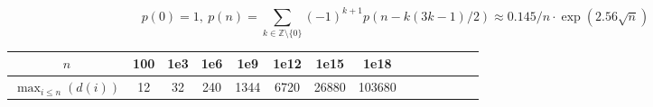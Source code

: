 \vspace{-0.5em}
\[
p(0) = 1,\ p(n) = \sum_{k \in \mathbb Z \setminus \{0\}}{(-1)^{k+1} p(n - k(3k-1) / 2)}
  \approx 0.145 / n \cdot \exp(2.56 \sqrt{n})
\]


\vspace{-1.5em}
\begin{center}
\begin{tabular}{c|c@{\ }c@{\ }c@{\ }c@{\ }c@{\ }c@{\ }c@{\ }c@{\ }c@{\ }c@{\ }c@{\ }c@{\ }c}
        $n$                      & 100 & 1e3 & 1e6 & 1e9  & 1e12 & 1e15  & 1e18 \\ \hline
        $\max _ {i\leq n}(d(i))$ & 12  & 32  & 240 & 1344 & 6720 & 26880 & 103680 \\
\end{tabular}
\end{center}



